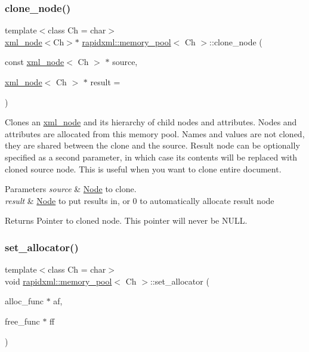 \subsubsection{\texorpdfstring{clone\+\_\+node()}{clone\_node()}}
{\footnotesize\ttfamily template$<$class Ch = char$>$ \\
\hyperlink{classrapidxml_1_1xml__node}{xml\+\_\+node}$<$Ch$>$$\ast$ \hyperlink{classrapidxml_1_1memory__pool}{rapidxml\+::memory\+\_\+pool}$<$ Ch $>$\+::clone\+\_\+node (\begin{DoxyParamCaption}\item[{const \hyperlink{classrapidxml_1_1xml__node}{xml\+\_\+node}$<$ Ch $>$ $\ast$}]{source,  }\item[{\hyperlink{classrapidxml_1_1xml__node}{xml\+\_\+node}$<$ Ch $>$ $\ast$}]{result = {} }\end{DoxyParamCaption})\hspace{0.3cm}{\ttfamily [inline]}}

Clones an \hyperlink{classrapidxml_1_1xml__node}{xml\+\_\+node} and its hierarchy of child nodes and attributes. Nodes and attributes are allocated from this memory pool. Names and values are not cloned, they are shared between the clone and the source. Result node can be optionally specified as a second parameter, in which case its contents will be replaced with cloned source node. This is useful when you want to clone entire document. 
\begin{DoxyParams}{Parameters}
{\em source} & \hyperlink{classNode}{Node} to clone. \\
\hline
{\em result} & \hyperlink{classNode}{Node} to put results in, or 0 to automatically allocate result node \\
\hline
\end{DoxyParams}
\begin{DoxyReturn}{Returns}
Pointer to cloned node. This pointer will never be N\+U\+LL. 
\end{DoxyReturn}
\mbox{\label{classrapidxml_1_1memory__pool_a84d3d8d2cdfc00501e1dcf26d889ae03}} 
\subsubsection{\texorpdfstring{set\+\_\+allocator()}{set\_allocator()}}
{\footnotesize\ttfamily template$<$class Ch = char$>$ \\
void \hyperlink{classrapidxml_1_1memory__pool}{rapidxml\+::memory\+\_\+pool}$<$ Ch $>$\+::set\+\_\+allocator (\begin{DoxyParamCaption}\item[{alloc\+\_\+func $\ast$}]{af,  }\item[{free\+\_\+func $\ast$}]{ff }\end{DoxyParamCaption})\hspace{0.3cm}{\ttfamily [inline]}}

